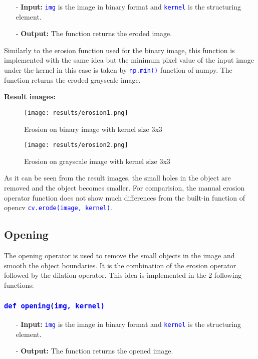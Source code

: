 \documentclass{report}
\begin{document}
\begin{itemize}
  \item[-] \textbf{Input:} \textcolor{blue}{\lstinline|img|} is the image in binary format and \textcolor{blue}{\lstinline|kernel|} is the structuring element.
  \item[-] \textbf{Output:} The function returns the eroded image.
\end{itemize}

Similarly to the erosion function used for the binary image, this function is implemented with the same idea but the minimum pixel value of the input image under the kernel in this case is taken by \textcolor{blue}{\lstinline|np.min()|} function of numpy. The function returns the eroded grayscale image.

\pagebreak
\textbf{Result images:}
\begin{figure}[H]
    \centering
    \texttt{[image: results/erosion1.png]}
    \caption{Erosion on binary image with kernel size 3x3}
    \bigskip
    \texttt{[image: results/erosion2.png]}
    \caption{Erosion on grayscale image with kernel size 3x3}
\end{figure}

As it can be seen from the result images, the small holes in the object are removed and the object becomes smaller. For comparision, the manual erosion operator function does not show much differences from the built-in function of opencv \textcolor{blue}{\lstinline|cv.erode(image, kernel)|}.

\pagebreak
\subsection{Opening}
The opening operator is used to remove the small objects in the image and smooth the object boundaries. It is the combination of the erosion operator followed by the dilation operator. This idea is implemented in the 2 following functions:

\subsubsection*{\textcolor{blue}{\lstinline|def opening(img, kernel)|}}

\begin{itemize}
  \item[-] \textbf{Input:} \textcolor{blue}{\lstinline|img|} is the image in binary format and \textcolor{blue}{\lstinline|kernel|} is the structuring element.
  \item[-] \textbf{Output:} The function returns the opened image.
\end{itemize}
\end{document}
